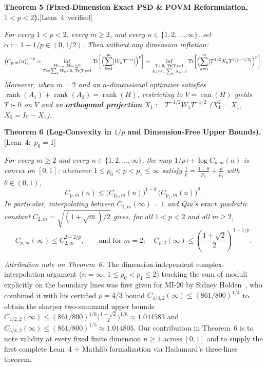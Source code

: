 \documentclass[10pt,letterpaper]{article}
\newcommand{\leanbadge}[1]{\mbox{\sffamily\scriptsize\color{leanborder}[#1]}}
\newcommand{\Tr}{\operatorname{Tr}}
\newcommand{\ran}{\operatorname{ran}}
\newcommand{\rank}{\operatorname{rank}}
\begin{document}
\begin{tcolorbox}[mathbox]
\textbf{Theorem 5 (Fixed-Dimension Exact PSD \& POVM Reformulation, $1 < p < 2$).}\hfill\leanbadge{Lean~4 verified}\par\vspace{1.5pt}
\emph{For every $1 < p < 2$, every $m \ge 2$, and every $n \in \{1, 2, \dots, \infty\}$, set $\alpha := 1 - 1/p \in (0, 1/2)$. Then without any dimension inflation:}
\[
  \bigl(C_{p,m}(n)\bigr)^{-p}
  = \inf_{\substack{W_1,\dots,W_m \succeq 0\\ T := \sum_k W_k \succ 0,\;\Tr(T)=1}}
    \Tr\biggl[\Bigl(\sum_{k=1}^m \bigl|W_k T^{-\alpha}\bigr|\Bigr)^p\biggr]
  = \inf_{\substack{T \succ 0,\;\Tr(T)=1\\ X_k \succeq 0,\;\sum_k X_k = I}}
    \Tr\biggl[\Bigl(\sum_{k=1}^m \bigl|T^{1/2} X_k T^{1/p - 1/2}\bigr|\Bigr)^p\biggr].
\]
\emph{Moreover, when $m = 2$ and an $n$-dimensional optimizer satisfies $\rank(A_1) + \rank(A_2) = \rank(H)$, restricting to $V = \ran(H)$ yields $T \succ 0$ on $V$ and an \textbf{orthogonal projection} $X_1 := T^{-1/2} W_1 T^{-1/2}$ ($X_1^2 = X_1$, $X_2 = I_V - X_1$).}
\end{tcolorbox}

\begin{tcolorbox}[mathbox]
\textbf{Theorem 6 (Log-Convexity in $1/p$ and Dimension-Free Upper Bounds).}\hfill\leanbadge{Lean~4: $p_0=1$}\par\vspace{1.5pt}
\emph{For every $m \ge 2$ and every $n \in \{1, 2, \dots, \infty\}$, the map $1/p \mapsto \log C_{p,m}(n)$ is convex on $[0, 1]$: whenever $1 \le p_0 < p < p_1 \le \infty$ satisfy $\frac{1}{p} = \frac{1-\theta}{p_0} + \frac{\theta}{p_1}$ with $\theta \in (0,1)$,}
\[
  C_{p,m}(n) \le \bigl(C_{p_0,m}(n)\bigr)^{1-\theta}\,\bigl(C_{p_1,m}(n)\bigr)^{\theta}.
\]
\emph{In particular, interpolating between $C_{1,m}(\infty) = 1$ and Qiu's exact quadratic constant $C_{2,m} = \sqrt{(1+\sqrt{m})/2}$ gives, for all $1 < p < 2$ and all $m \ge 2$,}
\[
  C_{p,m}(\infty) \le C_{2,m}^{2 - 2/p}, \qquad\text{and for } m = 2:\quad C_{p,2}(\infty) \le \left(\frac{1+\sqrt{2}}{2}\right)^{1 - 1/p}.
\]
\end{tcolorbox}

\emph{Attribution note on Theorem~6.} The dimension-independent complex-interpolation argument ($n = \infty$, $1 \le p_0 < p_1 \le 2$) tracking the sum of moduli explicitly on the boundary lines was first given for MI-20 by Sidney Holden~\cite[\S6]{Holden2026b}, who combined it with his certified $p = 4/3$ bound $C_{4/3,2}(\infty) \le (861/800)^{1/4}$ to obtain the sharper two-summand upper bounds $C_{3/2,2}(\infty) \le (861/800)^{1/6}\bigl(\frac{1+\sqrt{2}}{2}\bigr)^{1/6} \approx 1.044583$ and $C_{5/4,2}(\infty) \le (861/800)^{1/5} \approx 1.014805$. Our contribution in Theorem~6 is to note validity at every fixed finite dimension $n \ge 1$ across $[0, 1]$ and to supply the first complete Lean~4 + Mathlib formalization via Hadamard's three-lines theorem.
\end{document}
